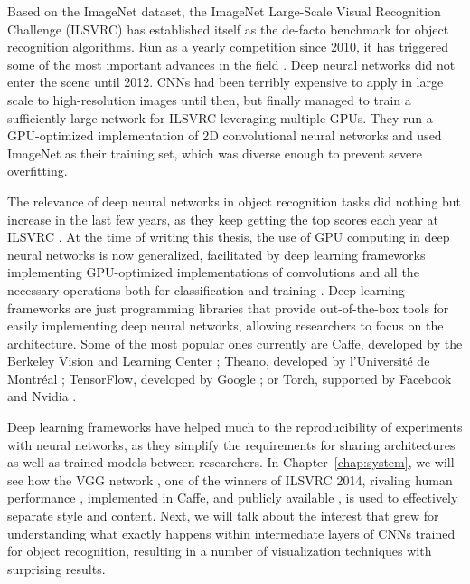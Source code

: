 Based on the ImageNet dataset, the ImageNet Large-Scale Visual Recognition Challenge (ILSVRC) has established itself as the de-facto benchmark for object recognition algorithms.
Run as a yearly competition since 2010, it has triggered some of the most important advances in the field \cite{Russakovsky2015}.
Deep neural networks did not enter the scene until 2012.
CNNs had been terribly expensive to apply in large scale to high-resolution images until then, but \citet{Krizhevsky2012} finally managed to train a sufficiently large network for ILSVRC leveraging multiple GPUs.
They run a GPU-optimized implementation of 2D convolutional neural networks and used ImageNet as their training set, which was diverse enough to prevent severe overfitting.

The relevance of deep neural networks in object recognition tasks did nothing but increase in the last few years, as they keep getting the top scores each year at ILSVRC \cite{Russakovsky2015}.
At the time of writing this thesis, the use of GPU computing in deep neural networks is now generalized, facilitated by deep learning frameworks implementing GPU-optimized implementations of convolutions and all the necessary operations both for classification and training \cite{Bahrampour2015}.
Deep learning frameworks are just programming libraries that provide out-of-the-box tools for easily implementing deep neural networks, allowing researchers to focus on the architecture.
Some of the most popular ones currently are Caffe, developed by the Berkeley Vision and Learning Center \cite{Jia2014}; Theano, developed by l’Université de Montréal \cite{Bergstra2010}; TensorFlow, developed by Google \cite{Abadi2015}; or Torch, supported by Facebook and Nvidia \cite{Collobert2002}.

Deep learning frameworks have helped much to the reproducibility of experiments with neural networks, as they simplify the requirements for sharing architectures as well as trained models between researchers.
In Chapter~\ref{chap:system}, we will see how the VGG network \cite{Simonyan2014}, one of the winners of ILSVRC 2014, rivaling human performance \cite{Russakovsky2015}, implemented in Caffe, and publicly available \cite{Simonyan2014web}, is used to effectively separate style and content.
Next, we will talk about the interest that grew for understanding what exactly happens within intermediate layers of CNNs trained for object recognition, resulting in a number of visualization techniques with surprising results.



